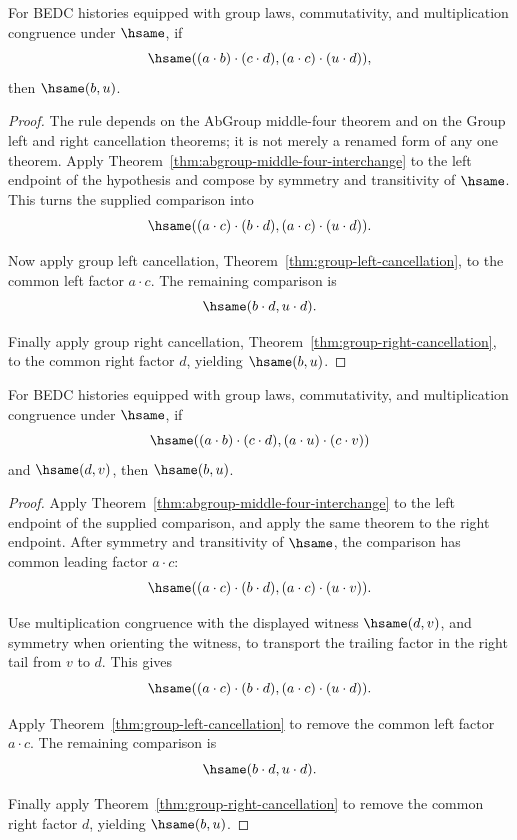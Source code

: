\begin{theorem}
\label{thm:abgroup-middle-four-double-cancel}
For BEDC histories equipped with group laws, commutativity, and multiplication
congruence under $\hsame$, if
$$
\hsame((a\cdot b)\cdot(c\cdot d),(a\cdot c)\cdot(u\cdot d)),
$$
then $\hsame(b,u)$.
\end{theorem}
\begin{proof}
The rule depends on the AbGroup middle-four theorem and on the Group left and
right cancellation theorems; it is not merely a renamed form of any one
theorem. Apply Theorem~\ref{thm:abgroup-middle-four-interchange} to the left
endpoint of the hypothesis and compose by symmetry and transitivity of
$\hsame$. This turns the supplied comparison into
$$
\hsame((a\cdot c)\cdot(b\cdot d),(a\cdot c)\cdot(u\cdot d)).
$$

Now apply group left cancellation, Theorem~\ref{thm:group-left-cancellation},
to the common left factor $a\cdot c$. The remaining comparison is
$$
\hsame(b\cdot d,u\cdot d).
$$

Finally apply group right cancellation, Theorem~\ref{thm:group-right-cancellation},
to the common right factor $d$, yielding $\hsame(b,u)$.
\end{proof}

\begin{theorem}
\label{thm:abgroup-middle-four-transported-double-cancel}
For BEDC histories equipped with group laws, commutativity, and multiplication
congruence under $\hsame$, if
$$
\hsame((a\cdot b)\cdot(c\cdot d),(a\cdot u)\cdot(c\cdot v))
$$
and $\hsame(d,v)$, then $\hsame(b,u)$.
\end{theorem}
\begin{proof}
Apply Theorem~\ref{thm:abgroup-middle-four-interchange} to the left endpoint
of the supplied comparison, and apply the same theorem to the right endpoint.
After symmetry and transitivity of $\hsame$, the comparison has common leading
factor $a\cdot c$:
$$
\hsame((a\cdot c)\cdot(b\cdot d),(a\cdot c)\cdot(u\cdot v)).
$$

Use multiplication congruence with the displayed witness $\hsame(d,v)$, and
symmetry when orienting the witness, to transport the trailing factor in the
right tail from $v$ to $d$. This gives
$$
\hsame((a\cdot c)\cdot(b\cdot d),(a\cdot c)\cdot(u\cdot d)).
$$

Apply Theorem~\ref{thm:group-left-cancellation} to remove the common left
factor $a\cdot c$. The remaining comparison is
$$
\hsame(b\cdot d,u\cdot d).
$$

Finally apply Theorem~\ref{thm:group-right-cancellation} to remove the common
right factor $d$, yielding $\hsame(b,u)$.
\end{proof}

